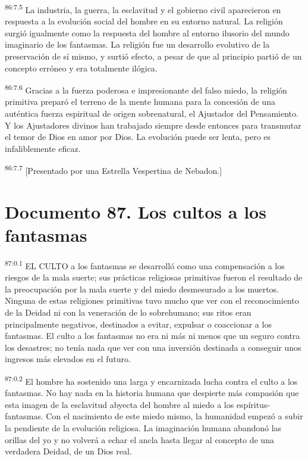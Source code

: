 \documentclass[twoside, 11pt]{book}
\begin{document}
\par
\textsuperscript{86:7.5} La industria, la guerra, la esclavitud y el gobierno civil aparecieron en respuesta a la evolución social del hombre en su entorno natural. La religión surgió igualmente como la respuesta del hombre al entorno ilusorio del mundo imaginario de los fantasmas. La religión fue un desarrollo evolutivo de la preservación de sí mismo, y surtió efecto, a pesar de que al principio partió de un concepto erróneo y era totalmente ilógica.

\par
\textsuperscript{86:7.6} Gracias a la fuerza poderosa e impresionante del falso miedo, la religión primitiva preparó el terreno de la mente humana para la concesión de una auténtica fuerza espiritual de origen sobrenatural, el Ajustador del Pensamiento. Y los Ajustadores divinos han trabajado siempre desde entonces para transmutar el temor de Dios en amor por Dios. La evolución puede ser lenta, pero es infaliblemente eficaz.

\par
\textsuperscript{86:7.7} [Presentado por una Estrella Vespertina de Nebadon.]


\chapter{Documento 87. Los cultos a los fantasmas}
\par
\textsuperscript{87:0.1} EL CULTO a los fantasmas se desarrolló como una compensación a los riesgos de la mala suerte; sus prácticas religiosas primitivas fueron el resultado de la preocupación por la mala suerte y del miedo desmesurado a los muertos. Ninguna de estas religiones primitivas tuvo mucho que ver con el reconocimiento de la Deidad ni con la veneración de lo sobrehumano; sus ritos eran principalmente negativos, destinados a evitar, expulsar o coaccionar a los fantasmas. El culto a los fantasmas no era ni más ni menos que un seguro contra los desastres; no tenía nada que ver con una inversión destinada a conseguir unos ingresos más elevados en el futuro.

\par
\textsuperscript{87:0.2} El hombre ha sostenido una larga y encarnizada lucha contra el culto a los fantasmas. No hay nada en la historia humana que despierte más compasión que esta imagen de la esclavitud abyecta del hombre al miedo a los espíritus-fantasmas. Con el nacimiento de este miedo mismo, la humanidad empezó a subir la pendiente de la evolución religiosa. La imaginación humana abandonó las orillas del yo y no volverá a echar el ancla hasta llegar al concepto de una verdadera Deidad, de un Dios real.
\end{document}

